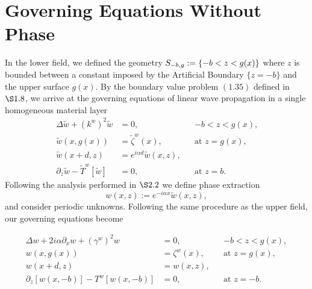 \section{Governing Equations Without Phase}
\label{intro:governing_equations_without_phase in lower field}
In the lower field, we defined the geometry $S_{\tiny{-} b,g}:=\{-b<z<g(x)\}$ where $z$ is bounded between a constant imposed by the Artificial Boundary $\{z=-b\}$ and the upper surface $g(x)$. By the boundary value problem $(1.35)$ defined in $\S1.8$, we arrive at the governing equations of linear wave propagation in a single homogeneous material layer
\begin{subequations}
\begin{align}
\Delta \tilde{w} + (k^w)^2\tilde{w}&=0, && \text{$-b<z<g(x)$,}\\
\tilde{w}(x,g(x))&=\tilde{\zeta}^w(x), && \text{at $z=g(x)$,}\\
\tilde{w}(x+d,z)&=e^{i\alpha d}\tilde{w}(x,z),\\
\partial_z \tilde{w} - \tilde{T}^w[\tilde{w}]&=0,&&  \text{at $z=b$.}
\end{align}
\end{subequations}
Following the analysis performed in $\S2.2$ we define phase extraction
$$w(x,z):= e^{-i\alpha x}\tilde{w}(x,z),$$
and consider periodic unknowns. Following the same procedure as the upper field, our governing equations become

\begin{subequations}
\begin{align}
\Delta w +2i\alpha\partial_xw+(\gamma^w)^2w&=0,&&\text{$-b<z<g(x)$}, \\
w(x,g(x))&={\zeta}^w(x),&& \text{at $z=g(x)$,}\\
w(x+d,z)&=w(x,z), \\
\partial_z \left[w(x,-b)\right] - T^w[w(x,-b)]&=0,&&\text{at $z=-b$}.
\end{align}
\end{subequations}